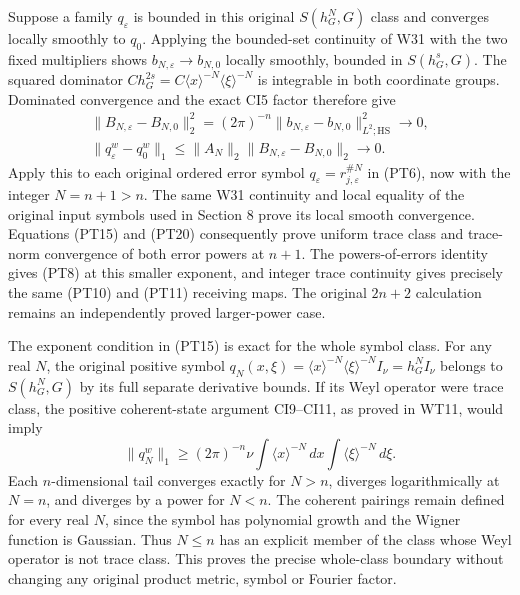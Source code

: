 \documentclass[
  11pt,
]{article}
\begin{document}
Suppose a family \(q_\varepsilon\) is bounded in this original
\(S(h_G^N,G)\) class and converges locally smoothly to \(q_0\). Applying
the bounded-set continuity of W31 with the two fixed multipliers shows
\(b_{N,\varepsilon}\to b_{N,0}\) locally smoothly, bounded in
\(S(h_G^s,G)\). The squared dominator
\(Ch_G^{2s}=C\langle x\rangle^{-N}\langle\xi\rangle^{-N}\) is integrable
in both coordinate groups. Dominated convergence and the exact CI5
factor therefore give \[
 \begin{gathered}
 \|B_{N,\varepsilon}-B_{N,0}\|_2^2
   =(2\pi)^{-n}\|b_{N,\varepsilon}-b_{N,0}\|_{L^2;\mathrm{HS}}^2
                    \longrightarrow0,\\
 \|q_\varepsilon^w-q_0^w\|_1
     \leq\|A_N\|_2\|B_{N,\varepsilon}-B_{N,0}\|_2
                    \longrightarrow0.                       \tag{PT20}
 \end{gathered}
\] Apply this to each original ordered error symbol
\(q_\varepsilon=r_{j,\varepsilon}^{\#N}\) in (PT6), now with the integer
\(N=n+1>n\). The same W31 continuity and local equality of the original
input symbols used in Section 8 prove its local smooth convergence.
Equations (PT15) and (PT20) consequently prove uniform trace class and
trace-norm convergence of both error powers at \(n+1\). The
powers-of-errors identity gives (PT8) at this smaller exponent, and
integer trace continuity gives precisely the same (PT10) and (PT11)
receiving maps. The original \(2n+2\) calculation remains an
independently proved larger-power case.

The exponent condition in (PT15) is exact for the whole symbol class.
For any real \(N\), the original positive symbol
\(q_N(x,\xi)=\langle x\rangle^{-N}\langle\xi\rangle^{-N}I_\nu
             =h_G^NI_\nu\) belongs to \(S(h_G^N,G)\) by its full
separate derivative bounds. If its Weyl operator were trace class, the
positive coherent-state argument CI9--CI11, as proved in WT11, would
imply \[
 \|q_N^w\|_1\geq(2\pi)^{-n}\nu
          \int\langle x\rangle^{-N}\,dx
          \int\langle\xi\rangle^{-N}\,d\xi.                   \tag{PT21}
\] Each \(n\)-dimensional tail converges exactly for \(N>n\), diverges
logarithmically at \(N=n\), and diverges by a power for \(N<n\). The
coherent pairings remain defined for every real \(N\), since the symbol
has polynomial growth and the Wigner function is Gaussian. Thus
\(N\leq n\) has an explicit member of the class whose Weyl operator is
not trace class. This proves the precise whole-class boundary without
changing any original product metric, symbol or Fourier factor.
\end{document}
